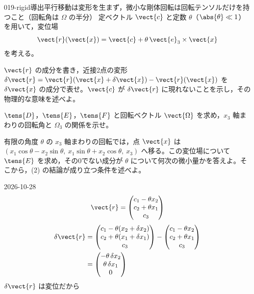 \documentclass[uplatex,dvipdfmx,a4paper,11pt]{jsarticle}
\begin{document}
\begin{mondai}{019-rigid}{導出}{平行移動は変形を生まず，微小な剛体回転は回転テンソルだけを持つこと（回転角は $\Omega$ の半分）}
定ベクトル $\vect{c}$ と定数 $\theta$（$\abs{\theta}\ll1$）を用いて，変位場
  \[ \vect{r}(\vect{x})=\vect{c}+\theta\,\vect{e}_3\times\vect{x} \]
  を考える。
  \begin{shoumon}
    \item $\vect{r}$ の成分を書き，近接2点の変形 $\delta\vect{r}=\vect{r}(\vect{x}+\delta\vect{x})-\vect{r}(\vect{x})$ を $\delta\vect{x}$ の成分で表せ。$\vect{c}$ が $\delta\vect{r}$ に現れないことを示し，その物理的な意味を述べよ。
    \item $\tens{D}$，$\tens{E}$，$\tens{F}$ と回転ベクトル $\vect{\Omega}$ を求め，$x_3$ 軸まわりの回転角と $\Omega_3$ の関係を示せ。
    \item 有限の角度 $\theta$ の $x_3$ 軸まわりの回転では，点 $\vect{x}$ は $(x_1\cos\theta-x_2\sin\theta,\ x_1\sin\theta+x_2\cos\theta,\ x_3)$ へ移る。この変位場について $\tens{E}$ を求め，その0でない成分が $\theta$ について何次の微小量かを答えよ。そこから，(2) の結論が成り立つ条件を述べよ。
  \end{shoumon}
\begin{kotaeutsushi}{2026-10-28}
\[ \vect{r}=\begin{pmatrix}c_{1}-\theta x_{2}\\c_{2}+\theta x_{1}\\c_{3}\end{pmatrix} \]
\begin{align*}
\delta\vect{r}&=\begin{pmatrix}c_{1}-\theta(x_{2}+\delta x_{2})\\c_{2}+\theta(x_{1}+\delta x_{1})\\c_{3}\end{pmatrix}-\begin{pmatrix}c_{1}-\theta x_{2}\\c_{2}+\theta x_{1}\\c_{3}\end{pmatrix}\\
&=\begin{pmatrix}-\theta\,\delta x_{2}\\\theta\,\delta x_{1}\\0\end{pmatrix}
\end{align*}
$\delta\vect{r}$ は変位だから

\end{kotaeutsushi}
\end{mondai}
\end{document}
